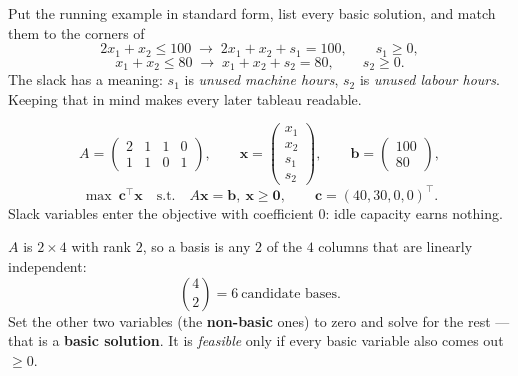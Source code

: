 \begin{worked}{Put the running example in standard form, list every basic solution, and match them to the corners of }
\[
  2x_{1}+x_{2}\le100
  \;\longrightarrow\;
  2x_{1}+x_{2}+s_{1}=100,\qquad s_{1}\ge0 ,
\]
\[
  x_{1}+x_{2}\le80
  \;\longrightarrow\;
  x_{1}+x_{2}+s_{2}=80,\qquad s_{2}\ge0 .
\]
The slack has a meaning: $s_{1}$ is \emph{unused machine hours}, $s_{2}$ is
\emph{unused labour hours}. Keeping that in mind makes every later tableau
readable.

\[
  A=\begin{pmatrix}2&1&1&0\\1&1&0&1\end{pmatrix},
  \qquad
  \mathbf x=\begin{pmatrix}x_{1}\\x_{2}\\s_{1}\\s_{2}\end{pmatrix},
  \qquad
  \mathbf b=\begin{pmatrix}100\\80\end{pmatrix},
\]
\[
  \max\ \mathbf c^{\!\top}\mathbf x
  \quad\text{s.t.}\quad
  A\mathbf x=\mathbf b,\ \mathbf x\ge\mathbf 0,
  \qquad
  \mathbf c=(40,30,0,0)^{\!\top}.
\]
Slack variables enter the objective with coefficient $0$: idle capacity
earns nothing.

$A$ is $2\times4$ with rank $2$, so a basis is any $2$ of the $4$ columns
that are linearly independent:
\[
  \binom{4}{2}=6\ \text{candidate bases.}
\]
Set the other two variables (the \textbf{non-basic} ones) to zero and solve
for the rest --- that is a \textbf{basic solution}. It is \emph{feasible}
only if every basic variable also comes out $\ge0$.


\end{worked}
